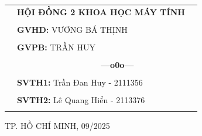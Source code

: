 \documentclass[a4paper]{article}
\theoremstyle{definition}
\begin{document}
\begin{titlepage}
\begin{table}[h]
\begin{tabular}{rll}
\hspace{6 cm} &  \textbf{\Large HỘI ĐỒNG 2
	 KHOA HỌC MÁY TÍNH}
\\
\\
\hspace{6 cm} &   \textbf{\Large GVHD:} {\Large VƯƠNG BÁ THỊNH}
\\
\\
\hspace{6 cm}  &   \textbf{\Large GVPB:} {\Large TRẦN HUY}
\\
\\
\hspace{6 cm} &     \textbf{$\;$ $\;$$\;$$\;$$\;$$\;$$\;$$\;$$\;$$\;$$\;$$\;$$\;$$\;$$\;$$\;$$\;$$\;$$\;$$\;$$\;$$\;$$\;$$\;$$\;$$\;$$\;$$\;$$\;$$\;$$\;$$\;$$\;$$\;$ \Large ---o0o---} 
\\
\\
\hspace{6 cm} &   \textbf{\Large SVTH1:} {\Large Trần Đan Huy - 2111356}
\\
\\
\hspace{6 cm}&   \textbf{\Large SVTH2:}  {\Large Lê Quang Hiển - 2113376}
\\
\\

\end{tabular}
\end{table}

\vspace{0.5cm}
\begin{center}
{\Large TP. HỒ CHÍ MINH, 09/2025}
\end{center}
\end{titlepage}
\newpage




\newpage
\tableofcontents
\newpage
\listoffigures
\newpage
\listoftables
\newpage
\setcounter{page}{1}


\newpage

\newpage

\newpage

\newpage

\newpage



\newpage

\end{document}
